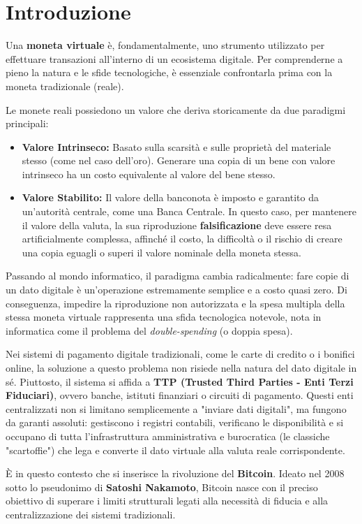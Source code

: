 \chapter*{Introduzione}
Una \textbf{moneta virtuale} è, fondamentalmente, uno strumento utilizzato per effettuare transazioni all'interno di un ecosistema digitale. Per comprenderne a pieno la natura e le sfide tecnologiche, è essenziale confrontarla prima con la moneta tradizionale (reale).

Le monete reali possiedono un valore che deriva storicamente da due paradigmi principali:
\begin{itemize}
    \item \textbf{Valore Intrinseco:} Basato sulla scarsità e sulle proprietà del materiale stesso (come nel caso dell'oro). Generare una copia di un bene con valore intrinseco ha un costo equivalente al valore del bene stesso.
    \item \textbf{Valore Stabilito:} Il valore della banconota è imposto e garantito da un'autorità centrale, come una Banca Centrale. In questo caso, per mantenere il valore della valuta, la sua riproduzione \textbf{falsificazione} deve essere resa artificialmente complessa, affinché il costo, la difficoltà o il rischio di creare una copia eguagli o superi il valore nominale della moneta stessa.
\end{itemize}

Passando al mondo informatico, il paradigma cambia radicalmente: fare copie di un dato digitale è un'operazione estremamente semplice e a costo quasi zero. Di conseguenza, impedire la riproduzione non autorizzata e la spesa multipla della stessa moneta virtuale rappresenta una sfida tecnologica notevole, nota in informatica come il problema del \textit{double-spending} (o doppia spesa).

Nei sistemi di pagamento digitale tradizionali, come le carte di credito o i bonifici online, la soluzione a questo problema non risiede nella natura del dato digitale in sé. Piuttosto, il sistema si affida a \textbf{TTP (Trusted Third Parties - Enti Terzi Fiduciari)}, ovvero banche, istituti finanziari o circuiti di pagamento. Questi enti centralizzati non si limitano semplicemente a "inviare dati digitali", ma fungono da garanti assoluti: gestiscono i registri contabili, verificano le disponibilità e si occupano di tutta l'infrastruttura amministrativa e burocratica (le classiche "scartoffie") che lega e converte il dato virtuale alla valuta reale corrispondente.

È in questo contesto che si inserisce la rivoluzione del \textbf{Bitcoin}. Ideato nel 2008 sotto lo pseudonimo di \textbf{Satoshi Nakamoto}, Bitcoin nasce con il preciso obiettivo di superare i limiti strutturali legati alla necessità di fiducia e alla centralizzazione dei sistemi tradizionali. 

